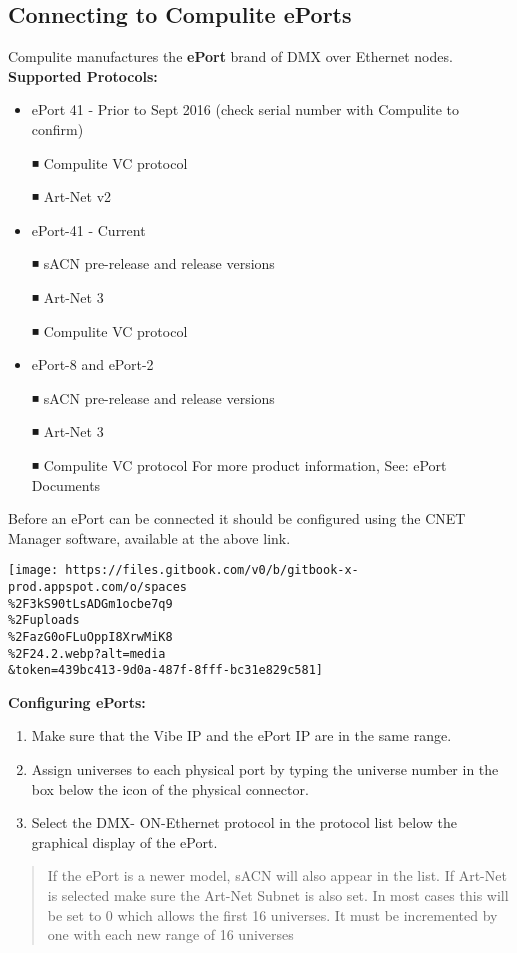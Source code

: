 \documentclass[
]{article}
\begin{document}
\hypertarget{connecting-to-compulite-eports}{%
\subsection{Connecting to Compulite ePorts}\label{connecting-to-compulite-eports}}

Compulite manufactures the \textbf{ePort} brand of DMX over Ethernet nodes. \textbf{Supported Protocols:}

\begin{itemize}
\item
  ePort 41 - Prior to Sept 2016 (check serial number with Compulite to confirm)

  ◾ Compulite VC protocol

  ◾ Art-Net v2
\item
  ePort-41 - Current

  ◾ sACN pre-release and release versions

  ◾ Art-Net 3

  ◾ Compulite VC protocol
\item
  ePort-8 and ePort-2

  ◾ sACN pre-release and release versions

  ◾ Art-Net 3

  ◾ Compulite VC protocol For more product information, See: ePort Documents
\end{itemize}

Before an ePort can be connected it should be configured using the CNET Manager software, available at the above link.

\texttt{[image: https://files.gitbook.com/v0/b/gitbook-x-prod.appspot.com/o/spaces\\\%2F3kS90tLsADGm1ocbe7q9\\\%2Fuploads\\\%2FazG0oFLuOppI8XrwMiK8\\\%2F24.2.webp?alt=media\\\&token=439bc413-9d0a-487f-8fff-bc31e829c581]}

\textbf{Configuring ePorts:}

\begin{enumerate}
\def\labelenumi{\arabic{enumi}.}
\item
  Make sure that the Vibe IP and the ePort IP are in the same range.
\item
  Assign universes to each physical port by typing the universe number in the box below the icon of the physical connector.
\item
  Select the DMX- ON-Ethernet protocol in the protocol list below the graphical display of the ePort.
\end{enumerate}

\begin{quote}
If the ePort is a newer model, sACN will also appear in the list. If Art-Net is selected make sure the Art-Net Subnet is also set. In most cases this will be set to 0 which allows the first 16 universes. It must be incremented by one with each new range of 16 universes
\end{quote}
\end{document}
